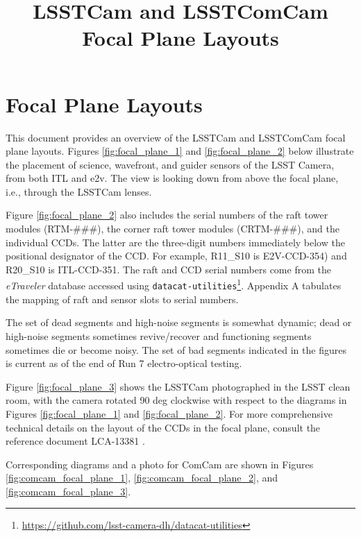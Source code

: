 \documentclass[CTN,authoryear,toc]{lsstdoc}
\title{LSSTCam and LSSTComCam Focal Plane Layouts}
\date{\vcsDate}
\begin{document}
\maketitle


\section{Focal Plane Layouts}
This document provides an overview of the LSSTCam \citep{10.71929/rubin/2571927} and LSSTComCam \citep{10.71929/rubin/2561361} focal plane layouts.
Figures \ref{fig:focal_plane_1} and \ref{fig:focal_plane_2} below illustrate the placement of science, wavefront, and guider sensors of the LSST Camera, from both ITL and e2v.
The view is looking down from above the focal plane, i.e., through the LSSTCam lenses.

Figure \ref{fig:focal_plane_2} also includes the serial numbers of the raft tower modules (RTM-\#\#\#), the corner raft tower modules (CRTM-\#\#\#), and the individual CCDs.
The latter are the three-digit numbers immediately below the positional designator of the CCD.
For example, R11\_S10 is E2V-CCD-354) and R20\_S10 is ITL-CCD-351.
The raft and CCD serial numbers come from the \emph{eTraveler} database accessed using {\tt{datacat-utilities}}\footnote{\url{https://github.com/lsst-camera-dh/datacat-utilities}}.
Appendix A tabulates the mapping of raft and sensor slots to serial numbers.

The set of dead segments and high-noise segments is somewhat dynamic; dead or high-noise segments sometimes revive/recover and functioning segments sometimes die or become noisy.
The set of bad segments indicated in the figures is current as of the end of Run 7 electro-optical testing.

Figure \ref{fig:focal_plane_3} shows the LSSTCam photographed in the LSST clean room, with the camera rotated 90 deg clockwise with respect to the diagrams in Figures \ref{fig:focal_plane_1} and \ref{fig:focal_plane_2}.
For more comprehensive technical details on the layout of the CCDs in the focal plane, consult the reference document LCA-13381 \citep{lca13381}.

Corresponding diagrams and a photo for ComCam are shown in Figures \ref{fig:comcam_focal_plane_1}, \ref{fig:comcam_focal_plane_2}, and \ref{fig:comcam_focal_plane_3}.
\end{document}

